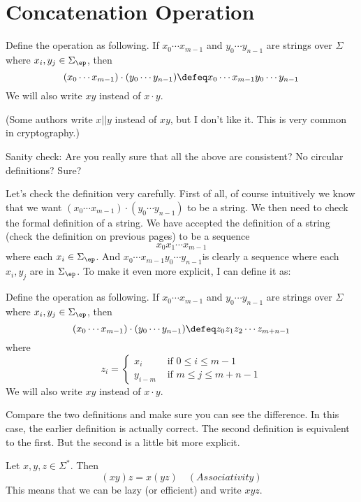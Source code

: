 \section{Concatenation Operation}

\begin{defn}
  Define the  operation as following. If
  $x_0 \cdots x_{m-1}$ and $y_0 \cdots y_{n-1}$ are strings over $\Sigma$ where
  $x_i,y_j \in \Sigma_\ep$, then
  \[
  (x_0 \cdots x_{m-1}) \cdot (y_0 \cdots y_{n-1})
  \defeq x_0 \cdots x_{m-1} y_0 \cdots y_{n-1}
  \]
  We will also write $xy$ instead of $x\cdot y$.
\end{defn}

(Some authors write $x||y$ instead of $xy$, but I don't like it.
This is very common in cryptography.)

Sanity check: Are you really sure that all the above are
consistent? No circular definitions? Sure?

Let's check the definition very carefully.
First of all, of course intuitively we know that we want 
$(x_0 \cdots x_{m-1}) \cdot (y_0 \cdots y_{n-1})$
to be a string.
We then need to check the formal definition of a string.
We have accepted the definition of a string (check the definition on previous pages) to be a sequence
\[
x_0 x_1 \cdots x_{m-1}
\]
where each $x_i \in \Sigma_\ep$.
And $x_0 \cdots x_{m-1} y_0 \cdots y_{n-1}$is clearly a sequence where each $x_i, y_j$ are in $\Sigma_\ep$.
To make it even more explicit, I can define it as:

\begin{defn}
  Define the  operation as following. If
  $x_0 \cdots x_{m-1}$ and $y_0 \cdots y_{n-1}$ are strings over $\Sigma$ where
  $x_i,y_j \in \Sigma_\ep$, then
  \[
  (x_0 \cdots x_{m-1}) \cdot (y_0 \cdots y_{n-1})
  \defeq z_0 z_1 z_2 \cdots z_{m + n - 1}
  \]
  where
  \[
  z_i =
  \begin{cases}
    x_i & \text{ if $0 \leq i \leq m - 1$} \\
    y_{i - m} & \text{ if $m \leq j \leq m + n - 1$}
  \end{cases}
  \]
  We will also write $xy$ instead of $x\cdot y$.
\end{defn}

Compare the two definitions and make sure you can see the difference.
In this case, the earlier definition is actually correct.
The second definition is equivalent to the first.
But the second is a little bit more explicit.


\newpage
\begin{prop}
Let $x,y,z\in \Sigma^*$. Then
\[ (xy) z = x(yz) \quad (Associativity) \]
This means that we can be lazy (or efficient) and write $xyz$.
\end{prop}


